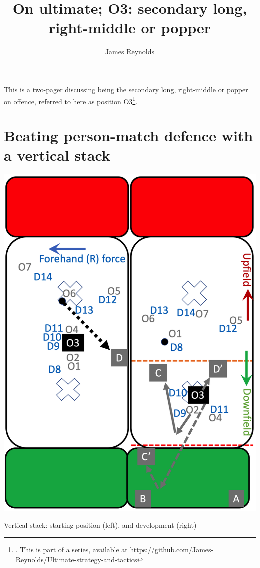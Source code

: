 \documentclass{tufte-handout}
\title{On ultimate; O3: secondary long, right-middle  or popper}
\author[James Reynolds]{James Reynolds}
\begin{document}
\maketitle%
This is 
a two-pager 
discussing being the 
secondary long, 
right-middle or
popper
on offence,
referred to here 
as position O3\footnote{.
This
is part of a series, 
available at
\url{https://github.com/James-Reynolds/Ultimate-strategy-and-tactics}}. 

\section{Beating person-match defence with a vertical stack}\label{sec:vertical}

\begin{marginfigure}%
  \includegraphics[width=\linewidth]{O3-vertical}
  \caption{Vertical stack: 
  starting position (left),
  and development (right)}
  \label{fig:O3-vertical}
\end{marginfigure}
\end{document}
